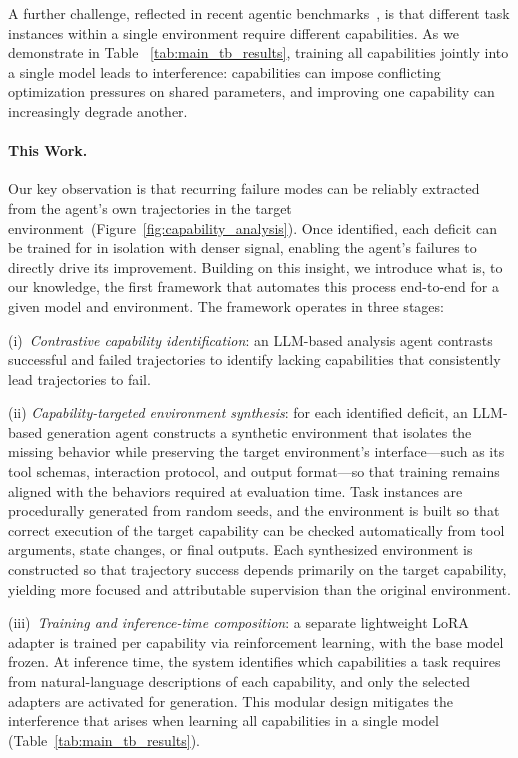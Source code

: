 A further challenge, reflected in recent agentic benchmarks~\citep{boisvert2025workarenacompositionalplanningreasoningbased, xu2025theagentcompanybenchmarkingllmagents}, is that different task instances within a single environment require different capabilities. As we demonstrate in Table ~\ref{tab:main_tb_results}, training all capabilities jointly into a single model leads to interference: capabilities can impose conflicting optimization pressures on shared parameters, and improving one capability can increasingly degrade another.

\paragraph{This Work.}
Our key observation is that recurring failure modes can be reliably extracted from the agent's own trajectories in the target environment~(Figure~\ref{fig:capability_analysis}). Once identified, each deficit can be trained for in isolation with denser signal, enabling the agent's failures to directly drive its improvement. Building on this insight, we introduce what is, to our knowledge, the first framework that automates this process end-to-end for a given model and environment. The framework operates in three stages:

(i)~\emph{Contrastive capability identification}: an LLM-based analysis agent contrasts successful and failed trajectories to identify lacking capabilities that consistently lead trajectories to fail.



(ii) \emph{Capability-targeted environment synthesis}: for each identified deficit, an LLM-based generation agent constructs a synthetic environment that isolates the missing behavior while preserving the target environment’s interface—such as its tool schemas, interaction protocol, and output format—so that training remains aligned with the behaviors required at evaluation time. Task instances are procedurally generated from random seeds, and the environment is built so that correct execution of the target capability can be checked automatically from tool arguments, state changes, or final outputs. Each synthesized environment is constructed so that trajectory success depends primarily on the target capability, yielding more focused and attributable supervision than the original environment.

(iii)~\emph{Training and inference-time composition}: a separate lightweight LoRA adapter is trained per capability via reinforcement learning, with the base model frozen. At inference time, the system identifies which capabilities a task requires from natural-language descriptions of each capability, and only the selected adapters are activated for generation. This modular design mitigates the interference that arises when learning all capabilities in a single model (Table~\ref{tab:main_tb_results}).   


